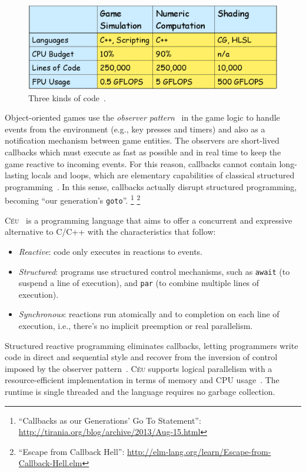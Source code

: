 \documentclass{vgtc}                          %
\newcommand{\CEU}{\textsc{C\'{e}u}\xspace}
\newcommand{\code}[1] {{\small{\texttt{#1}}}}
\begin{document}
\begin{figure}[t]
\centering
\includegraphics[width=\columnwidth]{sweeney}
\caption{Three kinds of code~\cite{games.sweeney}.
\label{fig.sweeney}
}
\end{figure}

Object-oriented games use the \emph{observer pattern}~\cite{games.patterns}
in the game logic to handle events from the environment (e.g., key presses and
timers) and also as a notification mechanism between game entities.
%
The observers are short-lived callbacks which must execute as fast as possible
and in real time to keep the game reactive to incoming events.
%
For this reason, callbacks cannot contain long-lasting locals and loops, which
are elementary capabilities of classical structured
programming~\cite{rp.deprecating,rp.rescala,sync_async.cooperative}.
%
In this sense, callbacks actually disrupt structured programming, becoming
``our generation's \code{goto}''.%
\footnote{``Callbacks as our Generations' Go To Statement'':
\url{http://tirania.org/blog/archive/2013/Aug-15.html}}%
\footnote{``Escape from Callback Hell'':
\url{http://elm-lang.org/learn/Escape-from-Callback-Hell.elm}}

\CEU~\cite{ceu.sensys13,ceu.mod15} is a programming language that aims to offer
a concurrent and expressive alternative to C/C++ with the characteristics that
follow:
%
\begin{itemize}
\item \emph{Reactive}: code only executes in reactions to events.
\item \emph{Structured}: programs use structured control mechanisms, such as
      \code{await} (to suspend a line of execution), and \code{par} (to combine
      multiple lines of execution).
\item \emph{Synchronous}: reactions run atomically and to completion on each
      line of execution, i.e., there's no implicit preemption or real
      parallelism.
\end{itemize}
%
Structured reactive programming eliminates callbacks, letting programmers write
code in direct and sequential style and recover from the inversion of control
imposed by the observer pattern~\cite{rp.deprecating}.
%
\CEU supports logical parallelism with a resource-efficient implementation in
terms of memory and CPU usage~\cite{ceu.sensys13}.
The runtime is single threaded and the language requires no garbage
collection.
\end{document}

